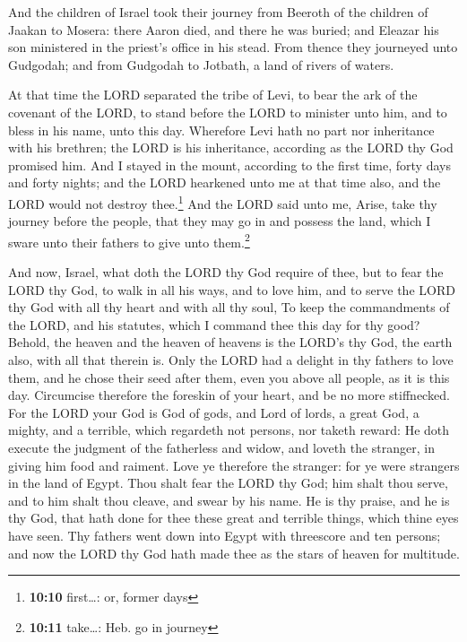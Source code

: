  And the children of Israel took their journey from
Beeroth of the children of Jaakan to Mosera: there Aaron died, and there
he was buried; and Eleazar his son ministered in the priest's office in
his stead.  From thence they journeyed unto Gudgodah; and
from Gudgodah to Jotbath, a land of rivers of waters.

 At that time the LORD separated the tribe of Levi, to
bear the ark of the covenant of the LORD, to stand before the LORD to
minister unto him, and to bless in his name, unto this day.
 Wherefore Levi hath no part nor inheritance with his
brethren; the LORD is his inheritance, according as the LORD thy God
promised him.  And I stayed in the mount, according to
the first time, forty days and forty nights; and the LORD hearkened unto
me at that time also, and the LORD would not destroy thee.\footnote{\textbf{10:10}
  first\ldots: or, former days}  And the LORD said unto
me, Arise, take thy journey before the people, that they may go in and
possess the land, which I sware unto their fathers to give unto
them.\footnote{\textbf{10:11} take\ldots: Heb. go in journey}

 And now, Israel, what doth the LORD thy God require of
thee, but to fear the LORD thy God, to walk in all his ways, and to love
him, and to serve the LORD thy God with all thy heart and with all thy
soul,  To keep the commandments of the LORD, and his
statutes, which I command thee this day for thy good? 
Behold, the heaven and the heaven of heavens is the LORD's thy God, the
earth also, with all that therein is.  Only the LORD had
a delight in thy fathers to love them, and he chose their seed after
them, even you above all people, as it is this day. 
Circumcise therefore the foreskin of your heart, and be no more
stiffnecked.  For the LORD your God is God of gods, and
Lord of lords, a great God, a mighty, and a terrible, which regardeth
not persons, nor taketh reward:  He doth execute the
judgment of the fatherless and widow, and loveth the stranger, in giving
him food and raiment.  Love ye therefore the stranger:
for ye were strangers in the land of Egypt.  Thou shalt
fear the LORD thy God; him shalt thou serve, and to him shalt thou
cleave, and swear by his name.  He is thy praise, and he
is thy God, that hath done for thee these great and terrible things,
which thine eyes have seen.  Thy fathers went down into
Egypt with threescore and ten persons; and now the LORD thy God hath
made thee as the stars of heaven for multitude.

